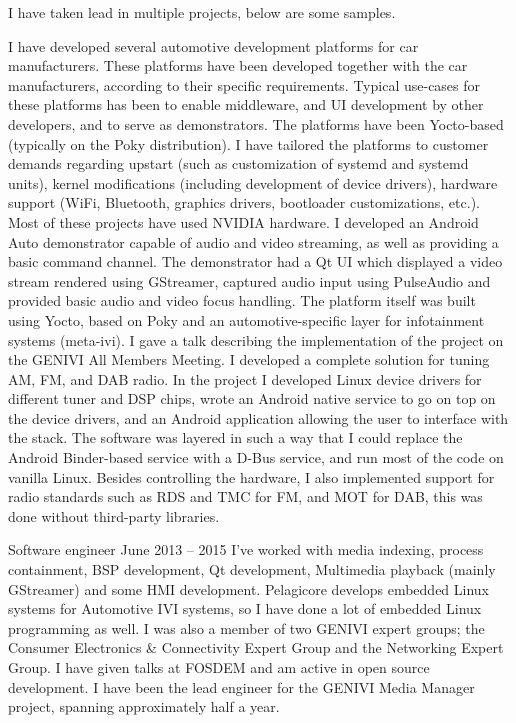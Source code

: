 \documentclass{twocolcv}
\begin{document}
           {
I have taken lead in multiple projects, below are some samples.\newline

        {I have developed several automotive development platforms for car manufacturers. These platforms have been developed together with the car manufacturers, according to their specific requirements. Typical use-cases for these platforms has been to enable middleware, and UI development by other developers, and to serve as demonstrators. The platforms have been Yocto-based (typically on the Poky distribution). I have tailored the platforms to customer demands regarding upstart (such as customization of systemd and systemd units), kernel modifications (including development of device drivers), hardware support (WiFi, Bluetooth, graphics drivers, bootloader customizations, etc.). Most of these projects have used NVIDIA hardware.}
\newline\newline
{}
        {I developed an Android Auto demonstrator capable of audio and video streaming, as well as providing a basic command channel. The demonstrator had a Qt UI which displayed a video stream rendered using GStreamer, captured audio input using PulseAudio and provided basic audio and video focus handling. The platform itself was built using Yocto, based on Poky and an automotive-specific layer for infotainment systems (meta-ivi). I gave a talk describing the implementation of the project on the GENIVI All Members Meeting.}
\newline\newline
{}
        {I developed a complete solution for tuning AM, FM, and DAB radio. In the project I developed Linux device drivers for different tuner and DSP chips, wrote an Android native service to go on top on the device drivers, and an Android application allowing the user to interface with the stack. The software was layered in such a way that I could replace the Android Binder-based service with a D-Bus service, and run most of the code on vanilla Linux. Besides controlling the hardware, I also implemented support for radio standards such as RDS and TMC for FM, and MOT for DAB, this was done without third-party libraries.}
}

     {Software engineer}
     {June 2013 -- 2015}
     {I've worked with media indexing, process containment, BSP development, Qt development, Multimedia playback (mainly GStreamer) and some HMI development. Pelagicore develops embedded Linux systems for Automotive IVI systems, so I have done a lot of embedded Linux programming as well. I was also a member of two GENIVI expert groups; the Consumer Electronics \& Connectivity Expert Group and the Networking Expert Group. I have given talks at FOSDEM and am active in open source development. I have been the lead engineer for the GENIVI Media Manager project, spanning approximately half a year.}
\end{document}

